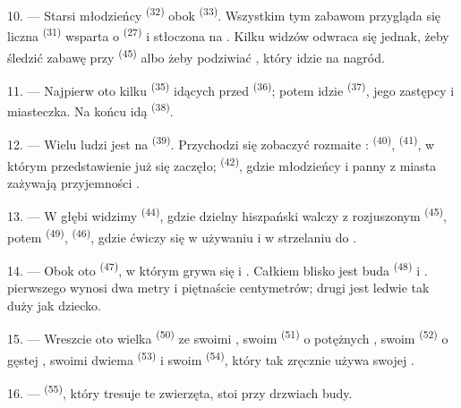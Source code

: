 10. --- Starsi młodzieńcy  \textsuperscript{(32)} obok
 \textsuperscript{(33)}. Wszystkim tym zabawom przygląda się liczna
 \textsuperscript{(31)} wsparta o  
\textsuperscript{(27)} i stłoczona na . Kilku widzów odwraca się jednak,
żeby śledzić zabawę przy  \textsuperscript{(45)} albo żeby
podziwiać , który idzie na  nagród.

11. --- Najpierw oto kilku  \textsuperscript{(35)} idących przed
 \textsuperscript{(36)}; potem idzie 
\textsuperscript{(37)}, jego zastępcy i  miasteczka. Na końcu idą
 \textsuperscript{(38)}.

\VUsaut{5.0mm}
\VUsaut{3.6mm}

12. --- Wielu ludzi jest na  \textsuperscript{(39)}. Przychodzi
się zobaczyć rozmaite :  \textsuperscript{(40)},
 \textsuperscript{(41)}, w którym przedstawienie już się zaczęło;
 \textsuperscript{(42)}, gdzie młodzieńcy i panny z miasta
zażywają przyjemności .

13. --- W głębi widzimy  \textsuperscript{(44)}, gdzie dzielny hiszpański
 walczy z rozjuszonym  \textsuperscript{(45)}, potem
 \textsuperscript{(49)}, 
\textsuperscript{(46)}, gdzie ćwiczy się w używaniu  i w strzelaniu
do .

14. --- Obok oto  \textsuperscript{(47)}, w którym grywa się
 i . Całkiem blisko jest buda 
\textsuperscript{(48)} i .  pierwszego wynosi dwa metry i
piętnaście centymetrów; drugi jest ledwie tak duży jak dziecko.

15. --- Wreszcie oto wielka  \textsuperscript{(50)} ze swoimi
, swoim  \textsuperscript{(51)} o
potężnych , swoim  \textsuperscript{(52)} o gęstej
, swoimi dwiema  \textsuperscript{(53)} i swoim
 \textsuperscript{(54)}, który tak zręcznie używa swojej
.

16. ---  \textsuperscript{(55)}, który tresuje te zwierzęta, stoi przy
drzwiach budy.
\VUsaut{6.0mm}
\VUfilet{22mm}
